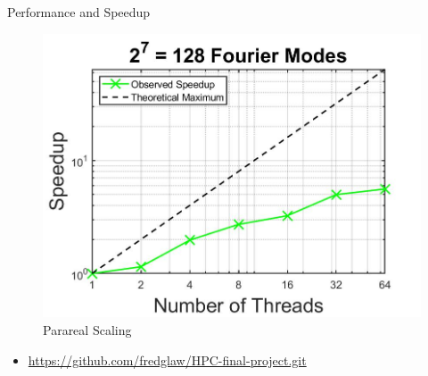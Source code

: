 \documentclass{beamer}
\begin{document}
\begin{frame}{Performance and Speedup}
\begin{minipage}{0.49\textwidth}
\begin{figure}
    \centering
    \includegraphics[width=\textwidth]{Images/Parareal_scaling.jpg}
    \caption{Parareal Scaling}
    \label{fig:Parareal_scaling}
\end{figure}
\end{minipage}

\begin{itemize}
    \item \url{https://github.com/fredglaw/HPC-final-project.git}
\end{itemize}

\end{frame}
\end{document}
